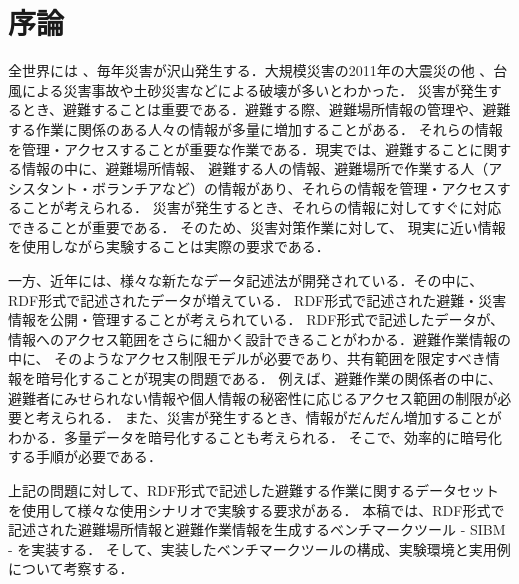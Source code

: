 ﻿%
\chapter{序論}
全世界には 、毎年災害が沢山発生する．大規模災害の2011年の大震災の他 、台風による災害事故や土砂災害などによる破壊が多いとわかった．
災害が発生するとき、避難することは重要である．避難する際、避難場所情報の管理や、避難する作業に関係のある人々の情報が多量に増加することがある．
それらの情報を管理・アクセスすることが重要な作業である．現実では、避難することに関する情報の中に、避難場所情報、
避難する人の情報、避難場所で作業する人（アシスタント・ボランチアなど）の情報があり、それらの情報を管理・アクセスすることが考えられる．
災害が発生するとき、それらの情報に対してすぐに対応できることが重要である． そのため、災害対策作業に対して、
現実に近い情報を使用しながら実験することは実際の要求である．

	一方、近年には、様々な新たなデータ記述法が開発されている．その中に、RDF形式で記述されたデータが増えている．
RDF形式で記述された避難・災害情報を公開・管理することが考えられている\cite{cite:opendata}．
RDF形式で記述したデータが、情報へのアクセス範囲をさらに細かく設計できることがわかる．避難作業情報の中に、
そのようなアクセス制限モデルが必要であり、共有範囲を限定すべき情報を暗号化することが現実の問題である．
例えば、避難作業の関係者の中に、避難者にみせられない情報や個人情報の秘密性に応じるアクセス範囲の制限が必要と考えられる\cite{cite:kodama}．
また、災害が発生するとき、情報がだんだん増加することがわかる．多量データを暗号化することも考えられる．
そこで、効率的に暗号化する手順が必要である\cite{cite:dat}．

	上記の問題に対して、RDF形式で記述した避難する作業に関するデータセットを使用して様々な使用シナリオで実験する要求がある．
本稿では、RDF形式で記述された避難場所情報と避難作業情報を生成するベンチマークツール - SIBM - を実装する．
そして、実装したベンチマークツールの構成、実験環境と実用例について考察する．
